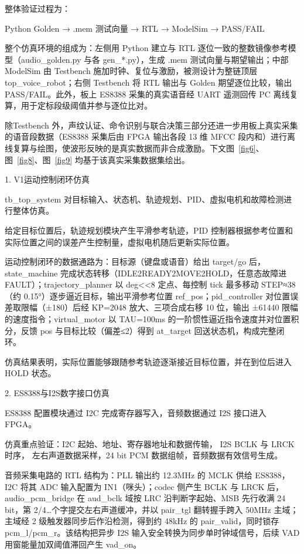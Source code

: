 \documentclass[UTF8,zihao=-4,fontset=windows]{ctexart}
\newcommand{\code}[1]{{\ttfamily #1}}
\newcommand{\subhead}[1]{%
  \par\medskip
  {\heiti\zihao{-4}#1}
  \nopagebreak
  \par\smallskip
}
\begin{document}
整体验证过程为：
\begin{center}
Python Golden → .mem 测试向量 → RTL → ModelSim → PASS/FAIL
\end{center}

整个仿真环境的组成为：左侧用 Python 建立与 RTL 逐位一致的整数镜像参考模型（\code{audio\_golden.py} 与各 \code{gen\_*.py}），生成 \code{.mem} 测试向量与期望输出；中部 ModelSim 由 Testbench 施加时钟、复位与激励，被测设计为整链顶层 \code{top\_voice\_robot}；右侧 Testbench 将 RTL 输出与 Golden 期望逐位比较，输出 PASS/FAIL。此外，板上 ES8388 采集的真实语音经 UART 遥测回传 PC 离线复算，用于定标段级阈值并参与逐位比对。

除Testbench 外，声纹认证、命令识别与联合决策三部分还进一步用板上真实采集的语音段数据（ES8388 采集后由 FPGA 输出各段 13 维 MFCC 段内和）进行离线复算与绘图，使波形反映的是真实数据而非合成激励。下文图~\ref{fig6}、图~\ref{fig8}、图~\ref{fig9} 均基于该真实采集数据集绘出。

\subhead{1. V1运动控制闭环仿真}

\code{tb\_top\_system} 对目标输入、状态机、轨迹规划、PID、虚拟电机和故障检测进行整体仿真。

给定目标位置后，轨迹规划模块产生平滑参考轨迹，PID 控制器根据参考位置和实际位置之间的误差产生控制量，虚拟电机随后更新实际位置。

运动控制闭环的数据通路为：目标源（键盘或语音）给出 \code{target/go} 后，\code{state\_machine} 完成状态转移（IDLE2READY2MOVE2HOLD，任意态故障进 FAULT）；\code{trajectory\_planner} 以 deg<<8 定点、每控制 tick 最多移动 STEP≈38（约 0.15°）逐步逼近目标，输出平滑参考位置 \code{ref\_pos}；\code{pid\_controller} 对位置误差取限幅（±180）后经 KP=2048 放大、三项合成右移 10 位，输出 ±61440 限幅的速度指令；\code{virtual\_motor} 以 TAU=100ms 的一阶惯性逼近指令速度并对位置积分，反馈 \code{pos} 与目标比较（偏差≤2）得到 \code{at\_target} 回送状态机，构成完整闭环。

仿真结果表明，实际位置能够跟随参考轨迹逐渐接近目标位置，并在到位后进入 HOLD 状态。

\subhead{2. ES8388与I2S数字接口仿真}

ES8388 配置模块通过 I2C 完成寄存器写入，音频数据通过 I2S 接口进入 FPGA。

仿真重点验证：I2C 起始、地址、寄存器地址和数据传输， I2S BCLK 与 LRCK 时序， 左右声道数据采样，24 bit PCM 数据组帧，音频数据有效信号生成。

音频采集电路的 RTL 结构为：PLL 输出约 12.3MHz 的 MCLK 供给 ES8388，I2C 将其 ADC 输入配置为 IN1（咪头）；codec 侧产生 BCLK 与 LRCK 后，\code{audio\_pcm\_bridge} 在 aud\_bclk 域按 LRC 沿判断字起始、MSB 先行收满 24 bit，第 2/4…个字提交左右声道缓冲，并以 \code{pair\_tgl} 翻转握手跨入 50MHz 主域；主域经 2 级触发器同步后作沿检测，得到约 48kHz 的 \code{pair\_valid}，同时锁存 \code{pcm\_l}/\code{pcm\_r}。该结构把异步 I2S 输入安全转换为同步单时钟域信号，后续 VAD 用窗能量加双阈值滞回产生 \code{vad\_on}。
\end{document}
